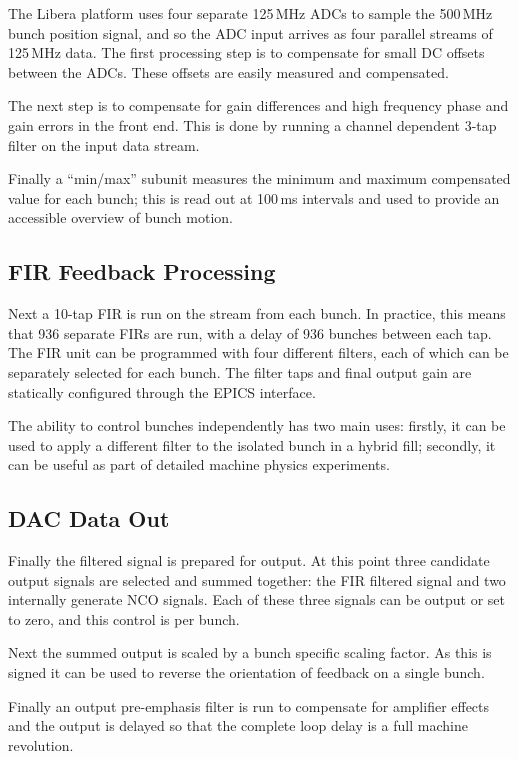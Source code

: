 \documentclass{jacow}
\begin{document}
The Libera platform uses four separate 125\,MHz ADCs to sample the 500\,MHz
bunch position signal, and so the ADC input arrives as four parallel streams of
125\,MHz data.  The first processing step is to compensate for small DC offsets
between the ADCs.  These offsets are easily measured and compensated.

The next step is to compensate for gain differences and high frequency phase and
gain errors in the front end.  This is done by running a channel dependent 3-tap
filter on the input data stream.

Finally a ``min/max'' subunit measures the minimum and maximum compensated value
for each bunch; this is read out at 100\,ms intervals and used to provide an
accessible overview of bunch motion.


\subsection{FIR Feedback Processing}

Next a 10-tap FIR is run on the stream from each bunch.  In practice, this means
that 936 separate FIRs are run, with a delay of 936 bunches between each tap.
The FIR unit can be programmed with four different filters, each of which can be
separately selected for each bunch.  The filter taps and final output gain are
statically configured through the EPICS interface.

The ability to control bunches independently has two main uses: firstly, it can
be used to apply a different filter to the isolated bunch in a hybrid fill;
secondly, it can be useful as part of detailed machine physics experiments.


\subsection{DAC Data Out}

Finally the filtered signal is prepared for output.  At this point three
candidate output signals are selected and summed together: the FIR filtered
signal and two internally generate NCO signals.  Each of these three signals can
be output or set to zero, and this control is per bunch.

Next the summed output is scaled by a bunch specific scaling factor.  As this is
signed it can be used to reverse the orientation of feedback on a single bunch.

Finally an output pre-emphasis filter is run to compensate for amplifier effects
and the output is delayed so that the complete loop delay is a full machine
revolution.
\end{document}
